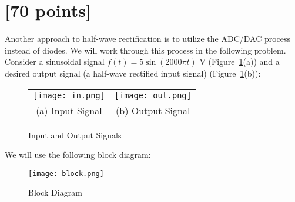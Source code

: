 

\section{[70 points]}

Another approach to half-wave rectification is to utilize the ADC/DAC process instead of diodes.  We will work through this process in the following problem.  Consider a sinusoidal signal $f(t) = 5 \sin(2000 \pi t)$ V (Figure~\ref{fig:sig}(a)) and a desired output signal (a half-wave rectified input signal) (Figure~\ref{fig:sig}(b)):

\begin{figure}[htb!]
\begin{tabular}{cc}
\centering
\texttt{[image: in.png]} &
\texttt{[image: out.png]} \\
(a) Input Signal & (b) Output Signal \\
\end{tabular}
\caption{Input and Output Signals}
\label{fig:sig}
\end{figure}

\vspace*{0.5in}

We will use the following block diagram:

\vspace*{0.5in}

\begin{figure}[htb!]
\centering
\texttt{[image: block.png]}
\caption{Block Diagram}
\label{fig:block}
\end{figure}

\clearpage



